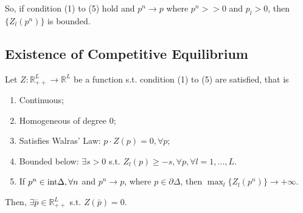 \documentclass[11pt]{elegantbook}
\begin{document}
So, if condition (1) to (5) hold and $p^n \rightarrow p$ where $p^n >>0$ and $p_l>0$, then $\{Z_l(p^n)\}$ is bounded.

\subsection{Existence of Competitive Equilibrium}
\begin{theorem}
    Let $Z: \mathbb{R}^L_{++} \rightarrow \mathbb{R}^L$ be a function s.t. condition (1) to (5) are satisfied, that is
    \begin{enumerate}[(1).]
        \item Continuous;
        \item Homogeneous of degree $0$;
        \item Satisfies Walras' Law: $p\cdot Z(p)=0, \forall p$;
        \item Bounded below: $\exists s>0$ s.t. $Z_l(p)\geq -s, \forall p, \forall l=1,...,L$.
        \item If $p^n\in \textnormal{int}\Delta, \forall n$ and $p^n \rightarrow p$, where $p\in \partial \Delta$, then $\max_l\{Z_l(p^n)\}\rightarrow +\infty$.
    \end{enumerate}
    Then, $\exists \bar{p}\in \mathbb{R}^L_{++}$ s.t. $Z(\bar{p})=0$.
\end{theorem}
\end{document}
